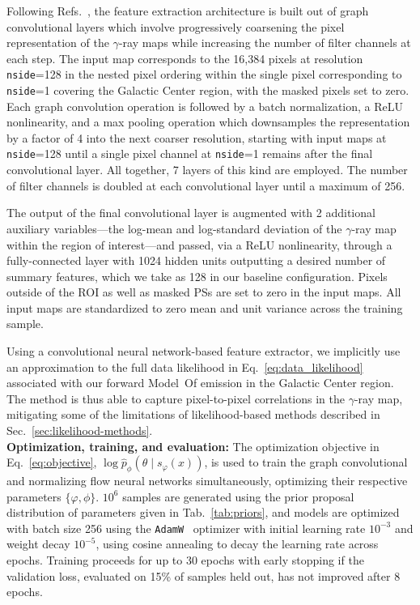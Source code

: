 \documentclass[prd,aps,10pt,nofootinbib,twocolumn,superscriptaddress,preprintnumbers,balancelastpage,longbibliography,floatfix]{revtex4-2}
\begin{document}
Following Refs.~\cite{Perraudin:2018rbt,List:2020mzd}, the feature extraction architecture is built out of graph convolutional layers which involve progressively coarsening the pixel representation of the $\gamma$-ray maps while increasing the number of filter channels at each step. The input map corresponds to the 16,384 pixels at \HEALPix resolution \texttt{nside}=128 in the nested pixel ordering within the single pixel corresponding to \texttt{nside}=1 covering the Galactic Center region, with the masked pixels set to zero. Each graph convolution operation is followed by a batch normalization, a ReLU nonlinearity, and a max pooling operation which downsamples the representation by a factor of 4 into the next coarser \HEALPix resolution, starting with input maps at \texttt{nside}=128 until a single pixel channel at \texttt{nside}=1 remains after the final convolutional layer. All together, 7 layers of this kind are employed. The number of filter channels is doubled at each convolutional layer until a maximum of 256. 

The output of the final convolutional layer is augmented with 2 additional auxiliary variables---the log-mean and log-standard deviation of the $\gamma$-ray map within the region of interest---and passed, via a ReLU nonlinearity, through a fully-connected layer with 1024 hidden units outputting a desired number of summary features, which we take as 128 in our baseline configuration. Pixels outside of the ROI as well as masked PSs are set to zero in the input maps. All input maps are standardized to zero mean and unit variance across the training sample.

Using a convolutional neural network-based feature extractor, we implicitly use an approximation to the full data likelihood in Eq.~\eqref{eq:data_likelihood} associated with our forward {Model~O}f emission in the Galactic Center region. The method is thus able to capture pixel-to-pixel correlations in the $\gamma$-ray map, mitigating some of the limitations of likelihood-based methods described in Sec.~\ref{sec:likelihood-methods}. \\

\noindent
\textbf{Optimization, training, and evaluation:} The optimization objective in Eq.~\eqref{eq:objective}, $\log \hat{p}_\phi(\theta\mid s_\varphi(x))$, is used to train the graph convolutional and normalizing flow neural networks simultaneously, optimizing their respective parameters $\{\varphi, \phi\}$. $10^{6}$ samples are generated using the prior proposal distribution of parameters given in Tab.~\ref{tab:priors}, and models are optimized with batch size 256 using the \texttt{AdamW}~\cite{DBLP:journals/corr/KingmaB14,DBLP:conf/iclr/LoshchilovH19} optimizer with initial learning rate $10^{-3}$ and weight decay $10^{-5}$, using cosine annealing to decay the learning rate across epochs. Training proceeds for up to 30 epochs with early stopping if the validation loss, evaluated on 15\% of samples held out, has not improved after 8 epochs. 
\end{document}
